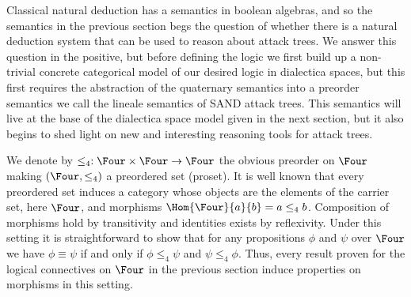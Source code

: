 Classical natural deduction has a semantics in boolean algebras, and
so the semantics in the previous section begs the question of whether
there is a natural deduction system that can be used to reason about
attack trees.  We answer this question in the positive, but before
defining the logic we first build up a non-trivial concrete
categorical model of our desired logic in dialectica spaces, but this
first requires the abstraction of the quaternary semantics into a
preorder semantics we call the lineale semantics of SAND attack trees.
This semantics will live at the base of the dialectica space model
given in the next section, but it also begins to shed light on new and
interesting reasoning tools for attack trees.

We denote by $\leq_4 : \Four \times \Four \to \Four$ the obvious
preorder on $\Four$ making $(\Four, \leq_4)$ a preordered set
(proset).  It is well known that every preordered set induces a
category whose objects are the elements of the carrier set, here
$\Four$, and morphisms $\Hom{\Four}{a}{b} = a \leq_4 b$.  Composition
of morphisms hold by transitivity and identities exists by
reflexivity.  Under this setting it is straightforward to show that
for any propositions $\phi$ and $\psi$ over $\Four$ we have $\phi
\equiv \psi$ if and only if $\phi \leq_4 \psi$ and $\psi \leq_4 \phi$.
Thus, every result proven for the logical connectives on $\Four$ in
the previous section induce properties on morphisms in this setting.

